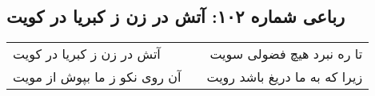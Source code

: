 \begin{center}
\section*{رباعی شماره ۱۰۲: آتش در زن ز کبریا در کویت}
\label{sec:sh102}
\begin{longtable}{l p{0.5cm} r}
آتش در زن ز کبریا در کویت
&&
تا ره نبرد هیچ فضولی سویت
\\
آن روی نکو ز ما بپوش از مویت
&&
زیرا که به ما دریغ باشد رویت
\\
\end{longtable}
\end{center}
